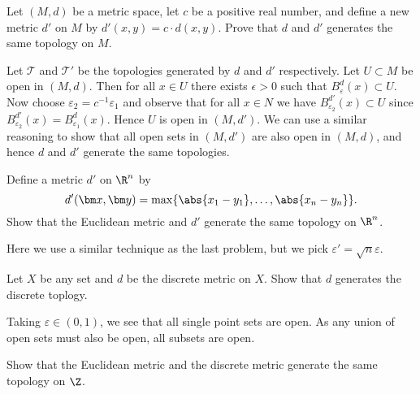 \begin{problem}
	Let $(M,d)$ be a metric space, let $c$ be a positive real number, and
	define a new metric $d'$ on $M$ by $d'(x,y) = c\cdot d(x,y)$.
	Prove that $d$ and $d'$ generates the same topology on $M$.
\end{problem}

\begin{solution}
	Let $\mathcal T$ and $\mathcal T'$ be the topologies generated by
	$d$ and $d'$ respectively.
	Let $U \subset M$ be open in $(M,d)$. 
	Then for all $x \in U$ there exists $\epsilon > 0$ such that
	$B_\varepsilon^d(x) \subset U$.
	Now choose $\varepsilon_2 = c^{-1}\varepsilon_1$ 
	and observe that for all $x \in N$ we have
	$B_{\varepsilon_2}^{d'}(x) \subset U$
	since $B_{\varepsilon_2}^{d'}(x) = B_{\varepsilon_1}^d(x)$.
	Hence $U$ is open in $(M,d')$.
	We can use a similar reasoning to show that all open sets in $(M,d')$ are
	also open in $(M,d)$, and hence $d$ and $d'$ generate the same topologies.
\end{solution}

\begin{problem}
	Define a metric $d'$ on $\R^n$ by
	\[
		d'(\bm x, \bm y) = \max\{\abs{x_1 - y_1}, \ldots, \abs{x_n - y_n}\}.
	\]
	Show that the Euclidean metric and $d'$ generate the same topology on 
	$\R^n$.
\end{problem}

\begin{solution}
	Here we use a similar technique as the last problem, but we pick
	$\varepsilon' = \sqrt n \varepsilon$.
\end{solution}

\begin{problem}
	Let $X$ be any set and $d$ be the discrete metric on $X$.
	Show that $d$ generates the discrete toplogy.
\end{problem}

\begin{solution}
	Taking $\varepsilon \in (0,1)$, we see that all single point sets are open.
	As any union of open sets must also be open,
	all subsets are open.
\end{solution}

\begin{problem}
	\label{prob:me}
	Show that the Euclidean metric and the discrete metric generate the same 
	topology on $\Z$. 
\end{problem}

